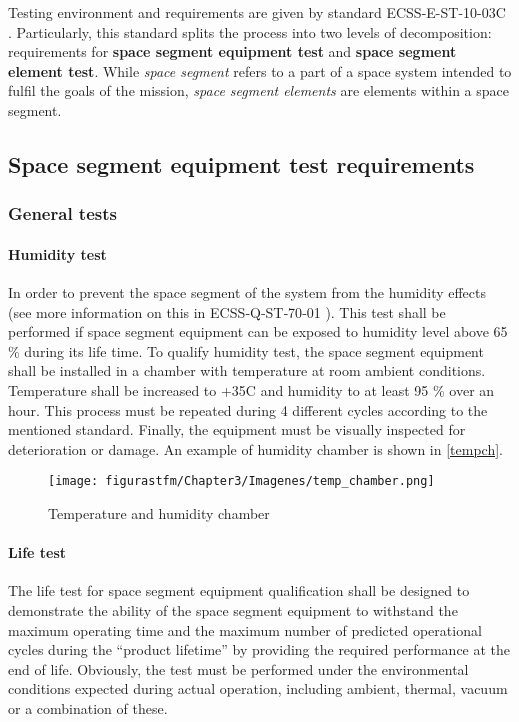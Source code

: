 Testing environment and requirements are given by standard ECSS-E-ST-10-03C \cite{ESAtest}. Particularly, this standard splits the process into two levels of decomposition: requirements for \textbf{space segment equipment test} and \textbf{space segment element test}. While \textit{space segment} refers to a part of a space system intended to fulfil the goals of the mission, \textit{space segment elements} are elements within a space segment.

\subsection{Space segment equipment test requirements} \label{spacesegment}

\subsubsection{General tests}
\paragraph{Humidity test}

In order to prevent the space segment of the system from the humidity effects (see more information on this in ECSS‐Q‐ST‐70‐01 \cite{ESAhumid}). This test shall be performed if space segment equipment can be exposed to humidity level above 65 \% during its life time. To qualify humidity test, the space segment equipment shall be installed in a chamber with temperature at room ambient conditions. Temperature shall be increased to +35\textdegree C and humidity to at least 95 \% over an hour. This process must be repeated during 4 different cycles according to the mentioned standard. Finally, the equipment must be visually inspected for deterioration or damage. An example of humidity chamber is shown in \autoref{tempch}.

			\begin{figure} [H] 				
				\centering
				\texttt{[image: figurastfm/Chapter3/Imagenes/temp\_chamber.png]}
				\caption{Temperature and humidity chamber \cite{tempchamber}} \label{tempch}
			\end{figure}


\paragraph{Life test}

The life test for space segment equipment qualification shall be designed to demonstrate the ability of the space segment equipment to withstand the maximum operating time and the maximum number of predicted operational cycles during the “product lifetime” by providing the required performance at the end of life. Obviously, the test must be performed under the environmental conditions expected during actual operation, including ambient, thermal, vacuum or a combination of these. 

